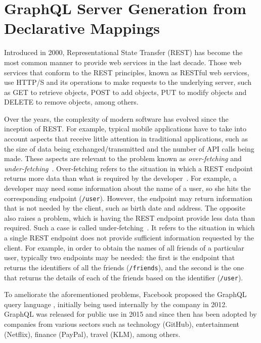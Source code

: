\section{GraphQL Server Generation from Declarative Mappings}
\label{chap6_morphgraphql}
Introduced in 2000, Representational State Transfer (REST) has become the most common manner to provide web services in the last decade. Those web services that conform to the REST principles, known as RESTful web services, use HTTP/S and its operations to make requests to the underlying server, such as GET to retrieve objects, POST to add objects, PUT to modify objects and DELETE to remove objects, among others.

Over the years, the complexity of modern software has evolved since the inception of REST. For example, typical mobile applications have to take into account aspects that receive little attention in traditional applications, such as the size of data being exchanged/transmitted and the number of API calls being made. These aspects are relevant to the problem known as \textit{over-fetching} and \textit{under-fetching}~\citep{bryant2017graphql,vogel2017experiences,mukhiya2019graphql}. Over-fetching refers to the situation in which a REST endpoint returns more data than what is required by the developer~\citep{bryant2017graphql,vogel2017experiences,mukhiya2019graphql}. For example, a developer may need some information about the name of a user, so she hits the corresponding endpoint (\texttt{/user}). However, the endpoint may return information that is not needed by the client, such as birth date and address. The opposite also raises a problem, which is having the REST endpoint provide less data than required. Such a case is called under-fetching~\citep{bryant2017graphql,vogel2017experiences,mukhiya2019graphql}. It refers to the situation in which a single REST endpoint does not provide sufficient information requested by the client. For example, in order to obtain the names of all friends of a particular user, typically two endpoints may be needed: the first is the endpoint that returns the identifiers of all the friends (\texttt{/friends}), and the second is the one that returns the details of each of the friends based on the identifier (\texttt{/user}).

To ameliorate the aforementioned problems, Facebook proposed the GraphQL query language \citep{graphql}, initially being used internally by the company in 2012. GraphQL was released for public use in 2015 and since then has been adopted by companies from various sectors such as technology (GitHub), entertainment (Netflix), finance (PayPal), travel (KLM), among others. 

